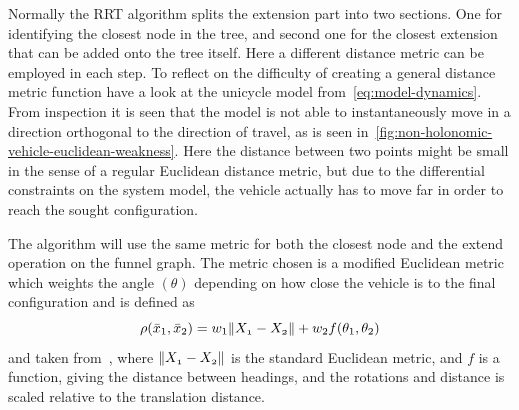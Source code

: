Normally the \ac{RRT} algorithm splits the extension part into two sections. One
for identifying the closest node in the tree, and second one for the closest
extension that can be added onto the tree itself. Here a different distance
metric can be employed in each step. To reflect on the difficulty of creating a
general distance metric function have a look at the unicycle model
from~\cref{eq:model-dynamics}. From inspection it is seen that the model is not
able to instantaneously move in a direction orthogonal to the direction of
travel, as is seen in~\cref{fig:non-holonomic-vehicle-euclidean-weakness}. Here
the distance between two points might be small in the sense of a regular
Euclidean distance metric, but due to the differential constraints on the system
model, the vehicle actually has to move far in order to reach the sought
configuration.

The \rrtfunnel{} algorithm will use the same metric for both the closest node
and the extend operation on the funnel graph. The metric chosen is a modified
Euclidean metric which weights the angle \((\theta)\) depending on how close the
vehicle is to the final configuration and is defined as
\[
  \rho(\bar{x}_{1}, \bar{x}_{2}) = w_{1}\lVert\mathnormal{X_{1}} - \mathnormal{X_{2}}\rVert +
  w_{2}f(\theta_1,\theta_2)
\]
and taken from~\cite{kuffnerEffectiveSamplingDistance2004}, where
\(\lVert\mathnormal{X_{1}} - \mathnormal{X_{2}}\rVert\) is the standard Euclidean
metric, and \(f\) is a function, giving the distance between headings, and the
rotations and distance is scaled relative to the translation distance.

